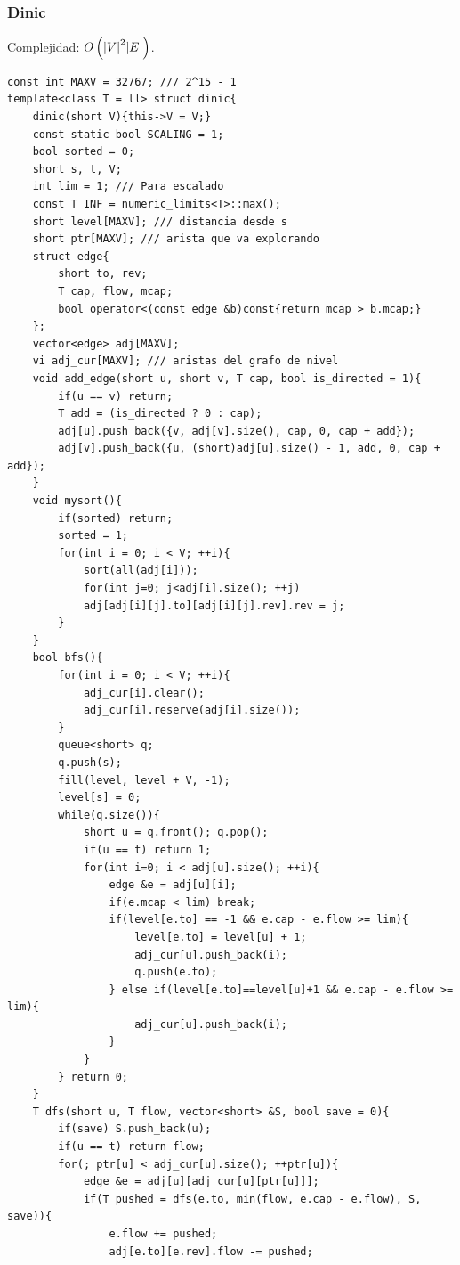 \documentclass[12 pts,spanish,mexico]{article}
\numberwithin{equation}{section}
\newcommand{\pa}[1]{\left( #1 \right)}
\begin{document}
\begin{multicols}{2}
\subsubsection{Dinic}
Complejidad: $O\pa{\abs{V}^2\abs{E}}$.
\begin{verbatim}
const int MAXV = 32767; /// 2^15 - 1
template<class T = ll> struct dinic{
    dinic(short V){this->V = V;}
    const static bool SCALING = 1;
    bool sorted = 0;
    short s, t, V;
    int lim = 1; /// Para escalado
    const T INF = numeric_limits<T>::max();
    short level[MAXV]; /// distancia desde s
    short ptr[MAXV]; /// arista que va explorando
    struct edge{
        short to, rev;
        T cap, flow, mcap;
        bool operator<(const edge &b)const{return mcap > b.mcap;}
    };
    vector<edge> adj[MAXV];
    vi adj_cur[MAXV]; /// aristas del grafo de nivel
    void add_edge(short u, short v, T cap, bool is_directed = 1){
        if(u == v) return;
        T add = (is_directed ? 0 : cap);
        adj[u].push_back({v, adj[v].size(), cap, 0, cap + add});
        adj[v].push_back({u, (short)adj[u].size() - 1, add, 0, cap + add});
    }
    void mysort(){
        if(sorted) return;
        sorted = 1;
        for(int i = 0; i < V; ++i){
            sort(all(adj[i]));
            for(int j=0; j<adj[i].size(); ++j)
            adj[adj[i][j].to][adj[i][j].rev].rev = j;
        }
    }
    bool bfs(){
        for(int i = 0; i < V; ++i){
            adj_cur[i].clear();
            adj_cur[i].reserve(adj[i].size());
        }
        queue<short> q;
        q.push(s);
        fill(level, level + V, -1);
        level[s] = 0;
        while(q.size()){
            short u = q.front(); q.pop();
            if(u == t) return 1;
            for(int i=0; i < adj[u].size(); ++i){
                edge &e = adj[u][i];
                if(e.mcap < lim) break;
                if(level[e.to] == -1 && e.cap - e.flow >= lim){
                    level[e.to] = level[u] + 1;
                    adj_cur[u].push_back(i);
                    q.push(e.to);
                } else if(level[e.to]==level[u]+1 && e.cap - e.flow >= lim){
                    adj_cur[u].push_back(i);
                }
            }
        } return 0;
    }
    T dfs(short u, T flow, vector<short> &S, bool save = 0){
        if(save) S.push_back(u);
        if(u == t) return flow;
        for(; ptr[u] < adj_cur[u].size(); ++ptr[u]){
            edge &e = adj[u][adj_cur[u][ptr[u]]];
            if(T pushed = dfs(e.to, min(flow, e.cap - e.flow), S, save)){
                e.flow += pushed;
                adj[e.to][e.rev].flow -= pushed;

\end{verbatim}
\end{multicols}
\end{document}
